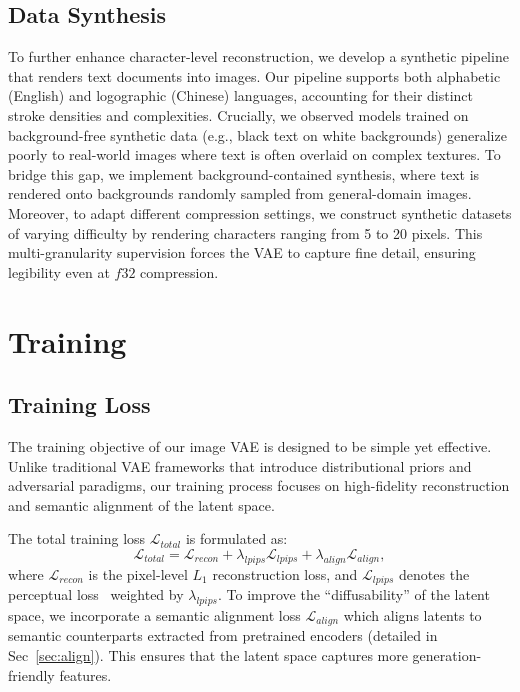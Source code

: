 \documentclass{llmxive}
\begin{document}
\subsection{Data Synthesis}
To further enhance character-level reconstruction, we develop a synthetic pipeline that renders text documents into images. Our pipeline supports both alphabetic (English) and logographic (Chinese) languages, accounting for their distinct stroke densities and complexities. Crucially, we observed models trained on background-free synthetic data (e.g., black text on white backgrounds) generalize poorly to real-world images where text is often overlaid on complex textures. To bridge this gap, we implement background-contained synthesis, where text is rendered onto backgrounds randomly sampled from general-domain images. Moreover, to adapt different compression settings, we construct synthetic datasets of varying difficulty by rendering characters ranging from 5 to 20 pixels. This multi-granularity supervision forces the VAE to capture fine detail, ensuring legibility even at $f32$ compression.


\section{Training}

\subsection{Training Loss}
The training objective of our image VAE is designed to be simple yet effective. Unlike traditional VAE frameworks that introduce distributional priors and adversarial paradigms, our training process focuses on high-fidelity reconstruction and semantic alignment of the latent space.

The total training loss $\mathcal{L}_{total}$ is formulated as:
\begin{equation}
\mathcal{L}_{total} = \mathcal{L}_{recon} + \lambda_{lpips} \mathcal{L}_{lpips} + \lambda_{align} \mathcal{L}_{align},
\end{equation}
where $\mathcal{L}_{recon}$ is the pixel-level $L_1$ reconstruction loss, and $\mathcal{L}_{lpips}$ denotes the perceptual loss~\citep{lpips} weighted by $\lambda_{lpips}$. To improve the ``diffusability'' of the latent space, we incorporate a semantic alignment loss $\mathcal{L}_{align}$ which aligns latents to semantic counterparts extracted from pretrained encoders (detailed in Sec~\ref{sec:align}). This ensures that the latent space captures more generation-friendly features.
\end{document}
